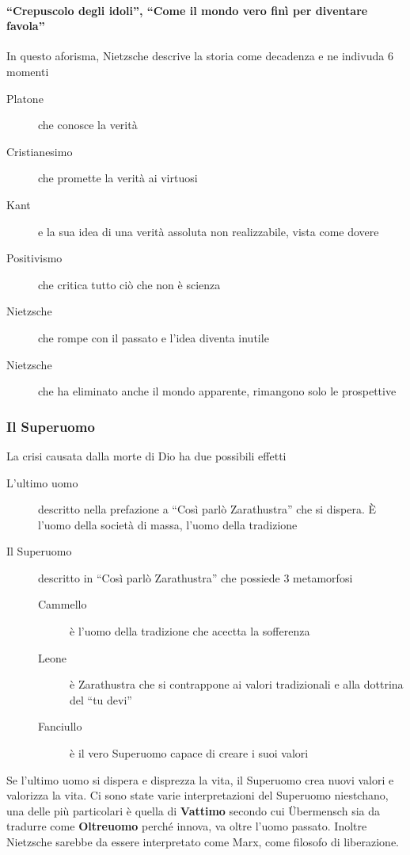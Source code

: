 \paragraph{``Crepuscolo degli idoli'', ``Come il mondo vero finì per diventare favola''}
In questo aforisma, Nietzsche descrive la storia come decadenza e ne indivuda 6 momenti
\begin{description}
  \item[Platone] che conosce la verità
  \item[Cristianesimo] che promette la verità ai virtuosi
  \item[Kant] e la sua idea di una verità assoluta non realizzabile, vista come dovere
  \item[Positivismo] che critica tutto ciò che non è scienza
  \item[Nietzsche] che rompe con il passato e l'idea diventa inutile
  \item[Nietzsche] che ha eliminato anche il mondo apparente, rimangono solo le prospettive
\end{description}

\subsubsection{Il Superuomo}
La crisi causata dalla morte di Dio ha due possibili effetti
\begin{description}
  \item[L'ultimo uomo] descritto nella prefazione a ``Così parlò Zarathustra'' che si dispera. È 
    l'uomo della società di massa, l'uomo della tradizione
  \item[Il Superuomo] descritto in ``Così parlò Zarathustra'' che possiede 3 metamorfosi
    \begin{description}
      \item[Cammello] è l'uomo della tradizione che acectta la sofferenza
      \item[Leone] è Zarathustra che si contrappone ai valori tradizionali e alla dottrina del 
        ``tu devi''
      \item[Fanciullo] è il vero Superuomo capace di creare i suoi valori
    \end{description}
\end{description}
Se l'ultimo uomo si dispera e disprezza la vita, il Superuomo crea nuovi valori e valorizza la vita.
Ci sono state varie interpretazioni del Superuomo niestchano, una delle più particolari è quella di
\textbf{Vattimo} secondo cui Übermensch sia da tradurre come \textbf{Oltreuomo} perché innova,
va oltre l'uomo passato. Inoltre Nietzsche sarebbe da essere interpretato come Marx, come filosofo
di liberazione.

